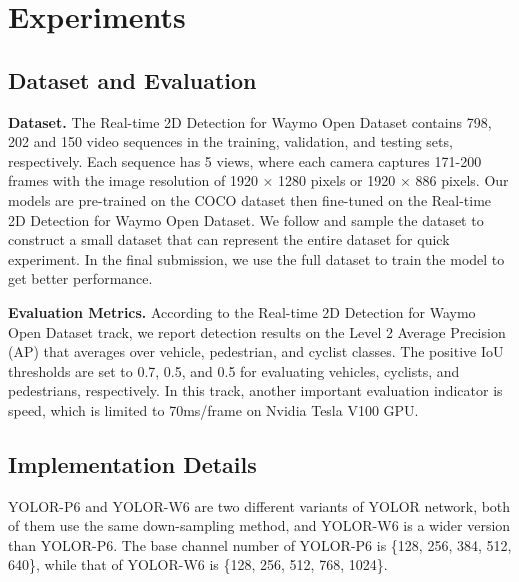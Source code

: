 \documentclass[final]{cvpr}
\begin{document}
\section{Experiments}

\subsection{Dataset and Evaluation}

\noindent\textbf{Dataset.}  The Real-time 2D Detection for Waymo Open Dataset \cite{waymowebsite} contains 798, 202 and 150 video sequences in the training, validation, and testing sets, respectively. Each sequence has 5 views, where each camera captures 171-200 frames with the image resolution of 1920 × 1280 pixels or 1920 × 886 pixels. Our models are pre-trained on the COCO dataset then fine-tuned on the Real-time 2D Detection for Waymo Open Dataset. We follow \cite{chen20202nd} and sample the dataset to construct a small dataset that can represent the entire dataset for quick experiment. In the final submission, we use the full dataset to train the model to get better performance.

\noindent\textbf{Evaluation Metrics.}  According to the Real-time 2D Detection for Waymo Open Dataset track, we report detection results on the Level 2 Average Precision (AP) that averages over vehicle, pedestrian, and cyclist classes. The positive IoU thresholds are set to 0.7, 0.5, and 0.5 for evaluating vehicles, cyclists, and pedestrians, respectively. In this track, another important evaluation indicator is speed, which is limited to 70ms/frame on Nvidia Tesla V100 GPU.

\subsection{Implementation Details}
YOLOR-P6 and YOLOR-W6 are two different variants of YOLOR network, both of them use the same down-sampling method, and YOLOR-W6 is a wider version than YOLOR-P6. The base channel number of YOLOR-P6 is \{128, 256, 384, 512, 640\}, while that of YOLOR-W6 is \{128, 256, 512, 768, 1024\}.
\end{document}
